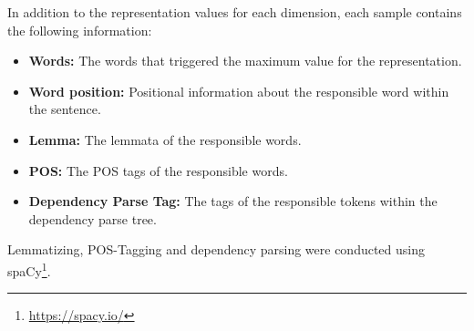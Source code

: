 \noindent
In addition to the representation values for each dimension, each sample contains the following information:
\begin{itemize}
\item \textbf{Words:} The words that triggered the maximum value for the representation.
\item \textbf{Word position:} Positional information about the responsible word within the sentence.
\item \textbf{Lemma:} The lemmata of the responsible words.
\item \textbf{\ac{POS}:} The \ac{POS} tags of the responsible words.
\item \textbf{Dependency Parse Tag:} The tags of the responsible tokens within the dependency parse tree.
\end{itemize}
Lemmatizing, \ac{POS}-Tagging and dependency parsing were conducted using spaCy\footnote{\href{https://spacy.io/}{https://spacy.io/}}.

